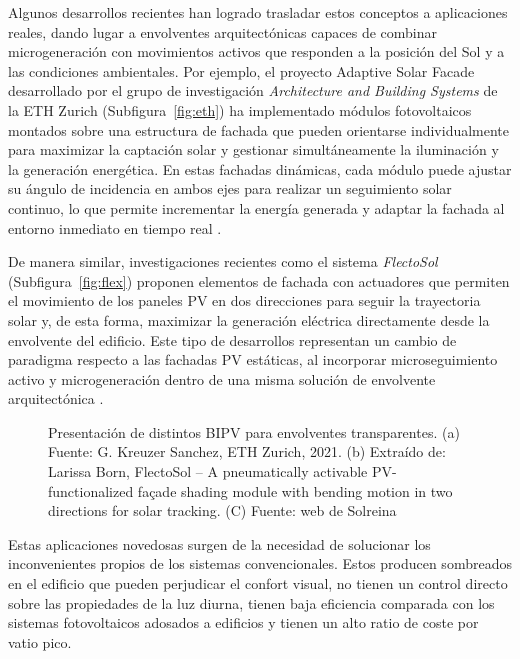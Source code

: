 Algunos desarrollos recientes han logrado trasladar estos conceptos a aplicaciones reales, dando lugar a envolventes arquitectónicas capaces de combinar microgeneración con movimientos activos que responden a la posición del Sol y a las condiciones ambientales. Por ejemplo, el proyecto Adaptive Solar Facade desarrollado por el grupo de investigación \textit{Architecture and Building Systems} de la ETH Zurich (Subfigura~\ref{fig:eth}) ha implementado módulos fotovoltaicos montados sobre una estructura de fachada que pueden orientarse individualmente para maximizar la captación solar y gestionar simultáneamente la iluminación y la generación energética. En estas fachadas dinámicas, cada módulo puede ajustar su ángulo de incidencia en ambos ejes para realizar un seguimiento solar continuo, lo que permite incrementar la energía generada y adaptar la fachada al entorno inmediato en tiempo real \cite{ASF_ETH2024}.  

De manera similar, investigaciones recientes como el sistema \textit{FlectoSol} (Subfigura~\ref{fig:flex}) proponen elementos de fachada con actuadores que permiten el movimiento de los paneles PV en dos direcciones para seguir la trayectoria solar y, de esta forma, maximizar la generación eléctrica directamente desde la envolvente del edificio. Este tipo de desarrollos representan un cambio de paradigma respecto a las fachadas PV estáticas, al incorporar microseguimiento activo y microgeneración dentro de una misma solución de envolvente arquitectónica \cite{BORN2024100372}.

\begin{figure}[t]
	\centering
	\subfloat[FlectoSol.]{
		
		\label{fig:flex}		
	}
	
	\caption{Presentación de distintos BIPV para envolventes transparentes.  (a) Fuente: G. Kreuzer Sanchez, ETH Zurich, 2021. (b) Extraído de: Larissa Born, FlectoSol – A pneumatically activable PV-functionalized façade shading module with bending motion in two directions for solar tracking. (C) Fuente: web de Solreina}
\end{figure}
\FloatBarrier

Estas aplicaciones novedosas surgen de la necesidad de solucionar los inconvenientes propios de los sistemas convencionales. Estos producen sombreados en el edificio que pueden perjudicar el confort visual, no tienen un control directo sobre las propiedades de la luz diurna, tienen baja eficiencia comparada con los sistemas fotovoltaicos adosados a edificios y tienen un alto ratio de coste por vatio pico.  

